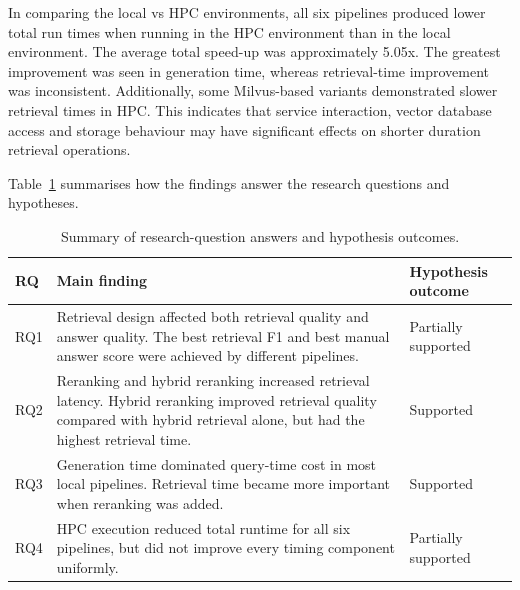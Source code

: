 In comparing the local vs \ac{HPC} environments, all six pipelines produced lower total run times when running in the \ac{HPC} environment than in the local environment. The average total speed-up was approximately 5.05x. The greatest improvement was seen in generation time, whereas retrieval-time improvement was inconsistent. Additionally, some Milvus-based variants demonstrated slower retrieval times in \ac{HPC}. This indicates that service interaction, vector database access and storage behaviour may have significant effects on shorter duration retrieval operations.

Table~\ref{tab:conclusion-rq-summary} summarises how the findings answer the research questions and hypotheses.

\begin{table}[htbp]
    \centering
    \small
    \setlength{\tabcolsep}{4pt}
    \renewcommand{\arraystretch}{1.25}
    \begin{tabular}{@{}
        >{\raggedright\arraybackslash}p{}
        >{\raggedright\arraybackslash}p{}
        >{\raggedright\arraybackslash}p{}
        @{}}
        \toprule
        \textbf{RQ} & \textbf{Main finding} & \textbf{Hypothesis outcome} \\
        \midrule
        RQ1 &
        Retrieval design affected both retrieval quality and answer quality. The best retrieval F1 and best manual answer score were achieved by different pipelines. &
        Partially supported \\
        \addlinespace

        RQ2 &
        Reranking and hybrid reranking increased retrieval latency. Hybrid reranking improved retrieval quality compared with hybrid retrieval alone, but had the highest retrieval time. &
        Supported \\
        \addlinespace

        RQ3 &
        Generation time dominated query-time cost in most local pipelines. Retrieval time became more important when reranking was added. &
        Supported \\
        \addlinespace

        RQ4 &
        \ac{HPC} execution reduced total runtime for all six pipelines, but did not improve every timing component uniformly. &
        Partially supported \\
        \bottomrule
    \end{tabular}
    \caption{Summary of research-question answers and hypothesis outcomes.}
    \label{tab:conclusion-rq-summary}
\end{table}

